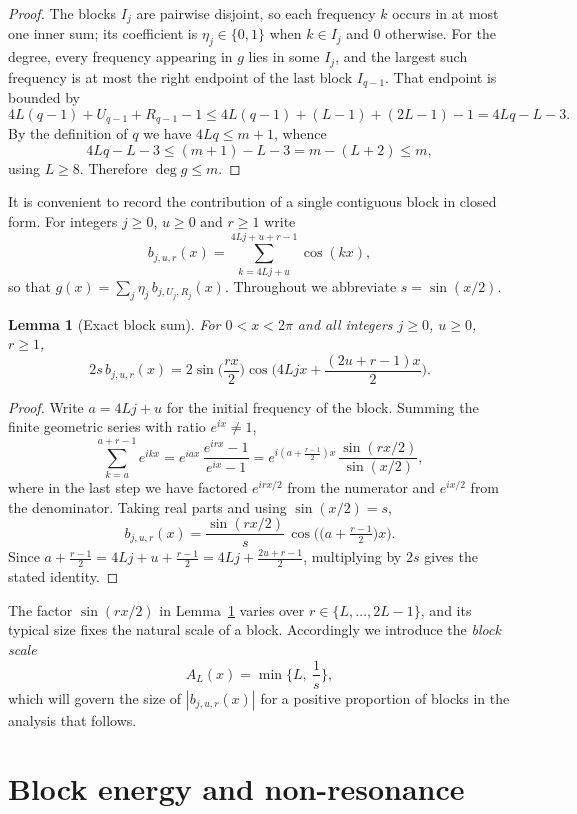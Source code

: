 \documentclass[11pt,reqno]{amsart}
\theoremstyle{plain}
\newtheorem{lemma}{Lemma}
\theoremstyle{definition}
\theoremstyle{remark}
\begin{document}
\begin{proof}
The blocks $I_j$ are pairwise disjoint, so each frequency $k$ occurs in at most one inner sum; its coefficient is $\eta_j\in\{0,1\}$ when $k\in I_j$ and $0$ otherwise. For the degree, every frequency appearing in $g$ lies in some $I_j$, and the largest such frequency is at most the right endpoint of the last block $I_{q-1}$. That endpoint is bounded by
\[
4L(q-1)+U_{q-1}+R_{q-1}-1\le 4L(q-1)+(L-1)+(2L-1)-1=4Lq-L-3.
\]
By the definition of $q$ we have $4Lq\le m+1$, whence
\[
4Lq-L-3\le (m+1)-L-3=m-(L+2)\le m,
\]
using $L\ge 8$. Therefore $\deg g\le m$.
\end{proof}

It is convenient to record the contribution of a single contiguous block in closed form. For integers $j\ge 0$, $u\ge 0$ and $r\ge 1$ write
\[
b_{j,u,r}(x)=\sum_{k=4Lj+u}^{4Lj+u+r-1}\cos(kx),
\]
so that $g(x)=\sum_{j}\eta_j\,b_{j,U_j,R_j}(x)$. Throughout we abbreviate $s=\sin(x/2)$.

\begin{lemma}[Exact block sum]\label{lem:block-sum}
For $0<x<2\pi$ and all integers $j\ge 0$, $u\ge 0$, $r\ge 1$,
\[
2s\,b_{j,u,r}(x)=2\sin\!\Big(\frac{rx}{2}\Big)\cos\!\Big(4Ljx+\frac{(2u+r-1)x}{2}\Big).
\]
\end{lemma}

\begin{proof}
Write $a=4Lj+u$ for the initial frequency of the block. Summing the finite geometric series with ratio $e^{ix}\ne 1$,
\[
\sum_{k=a}^{a+r-1}e^{ikx}
=e^{iax}\,\frac{e^{irx}-1}{e^{ix}-1}
=e^{i(a+\frac{r-1}{2})x}\,\frac{\sin(rx/2)}{\sin(x/2)},
\]
where in the last step we have factored $e^{i r x/2}$ from the numerator and $e^{ix/2}$ from the denominator. Taking real parts and using $\sin(x/2)=s$,
\[
b_{j,u,r}(x)=\frac{\sin(rx/2)}{s}\,\cos\!\Big(\big(a+\tfrac{r-1}{2}\big)x\Big).
\]
Since $a+\tfrac{r-1}{2}=4Lj+u+\tfrac{r-1}{2}=4Lj+\tfrac{2u+r-1}{2}$, multiplying by $2s$ gives the stated identity.
\end{proof}

The factor $\sin(rx/2)$ in Lemma~\ref{lem:block-sum} varies over $r\in\{L,\dots,2L-1\}$, and its typical size fixes the natural scale of a block. Accordingly we introduce the \emph{block scale}
\[
A_L(x)=\min\Big\{L,\ \frac{1}{s}\Big\},
\]
which will govern the size of $|b_{j,u,r}(x)|$ for a positive proportion of blocks in the analysis that follows.

\section{Block energy and non-resonance}
\end{document}
